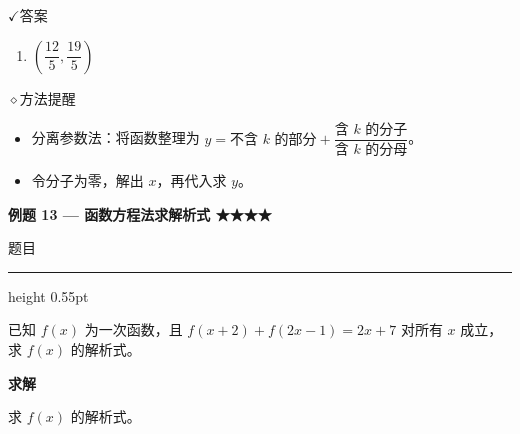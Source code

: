 \documentclass{exam-zh}
\newcommand{\eduSectionTitle}[1]{%
  \needspace{5\baselineskip}%
  \vspace{2mm}
  {\color{edu-blue}\bfseries\large #1}\par
  \vspace{3mm}
}
\newenvironment{eduSubQuestionItem}[1]{%
  \needspace{4\baselineskip}%
  \vspace{2mm}
  \par\noindent
  \hangindent=8mm\hangafter=1
  {\color{edu-blue}\bfseries #1}\enspace
  \begingroup
  \color{edu-ink}
}{%
  \endgroup
  \par
  \vspace{3mm}
}
\newcommand{\eduIconCheck}{\(\checkmark\)}
\newcommand{\eduIconPin}{\(\diamond\)}
\newenvironment{eduProblemBlock}[1][题目]{%
  \needspace{8\baselineskip}
  {\small\color{edu-muted}#1}\par
  \vspace{1.5mm}
  {\color{edu-blue}\hrule height 0.55pt}
  \vspace{4.5mm}
  \begingroup
  \color{edu-ink}
  \large
  \setlength{\parskip}{2.2mm}
  \linespread{1.20}\selectfont
}{%
  \par
  \endgroup
  \vspace{6mm}
}
\newenvironment{eduBulletList}{%
  \begin{itemize}[
    label=\textbullet,
    leftmargin=5mm,
    itemsep=1.2mm,
    topsep=0pt,
    parsep=0pt
  ]
}{%
  \end{itemize}
}
\newenvironment{eduBottomGrid}{%
  \vspace{1mm}
  \par\noindent
}{%
  \par\vspace{1mm}
}
\newenvironment{eduSummaryLeft}{%
  \begin{minipage}[t]{0.30\linewidth}
}{%
  \end{minipage}
}
\newcommand{\eduSummaryDivider}{%
  \hspace{4mm}{\color{edu-line}\vrule width 0.35pt}\hspace{7mm}%
}
\newenvironment{eduSummaryRight}{%
  \begin{minipage}[t]{0.58\linewidth}
}{%
  \end{minipage}
}
\newenvironment{eduPlainList}{%
  \begin{enumerate}[
    label=(\arabic*),
    leftmargin=7mm,
    itemsep=1.2mm,
    topsep=0pt,
    parsep=0pt
  ]
}{%
  \end{enumerate}
}
\begin{document}
\begin{eduBottomGrid}
  \begin{eduSummaryLeft}
    \begin{eduSummaryBlock}{\eduIconCheck}{答案}
    \begin{eduPlainList}
      \item $\left(\dfrac{12}{5}, \dfrac{19}{5}\right)$    \end{eduPlainList}
    \end{eduSummaryBlock}
  \end{eduSummaryLeft}
  \eduSummaryDivider
  \begin{eduSummaryRight}
    \begin{eduSummaryBlock}{\eduIconPin}{方法提醒}
    \begin{eduBulletList}
      \item 分离参数法：将函数整理为 $y = \text{不含 } k \text{ 的部分} + \dfrac{\text{含 } k \text{ 的分子}}{\text{含 } k \text{ 的分母}}$。      \item 令分子为零，解出 $x$，再代入求 $y$。    \end{eduBulletList}
    \end{eduSummaryBlock}
  \end{eduSummaryRight}
\end{eduBottomGrid}



\eduSectionTitle{例题 13 — 函数方程法求解析式 ★★★★}

\begin{eduProblemBlock}[题目]
已知 $f(x)$ 为一次函数，且 $f(x + 2) + f(2x - 1) = 2x + 7$ 对所有 $x$ 成立，求 $f(x)$ 的解析式。
\end{eduProblemBlock}





\begin{eduSubQuestionItem}{求解}
求 $f(x)$ 的解析式。\end{eduSubQuestionItem}
\end{document}
